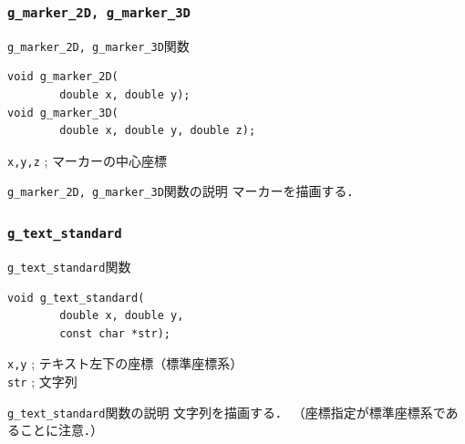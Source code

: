 \documentclass[platex,a4paper,12pt]{jsarticle}%
\begin{document}
\subsubsection{\texttt{g\_marker\_2D, g\_marker\_3D}}

\begin{itembox}[l]{\texttt{g\_marker\_2D, g\_marker\_3D}関数}
\begin{verbatim}
void g_marker_2D(
        double x, double y);
void g_marker_3D(
        double x, double y, double z);	
\end{verbatim}
\verb|x,y,z| ; マーカーの中心座標
\end{itembox}

\begin{itembox}[l]{\texttt{g\_marker\_2D, g\_marker\_3D}関数の説明}
マーカーを描画する．
\end{itembox}

\begin{figure}[htb]
\end{figure}




\clearpage
\subsubsection{\texttt{g\_text\_standard}}

\begin{itembox}[l]{\texttt{g\_text\_standard}関数}
\begin{verbatim}
void g_text_standard(
        double x, double y,
        const char *str);
\end{verbatim}
\verb|x,y| ; テキスト左下の座標（標準座標系）\\
\verb|str| ; 文字列
\end{itembox}

\begin{itembox}[l]{\texttt{g\_text\_standard}関数の説明}
文字列を描画する．
（座標指定が標準座標系であることに注意．）
\end{itembox}
\end{document}
